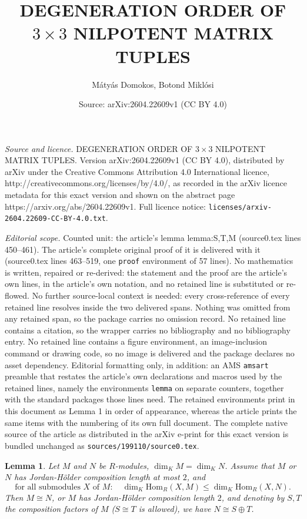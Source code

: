 \documentclass[10pt,a4paper]{amsart}
\title{DEGENERATION ORDER OF $3\times 3$ NILPOTENT MATRIX TUPLES}
\author{M\'aty\'as Domokos, Botond Mikl\'osi}
\date{Source: arXiv:2604.22609v1 (CC BY 4.0)}
\newtheorem{lemma}{Lemma}
\newcommand{\field}{K}
\renewcommand{\hom}{\mathrm{Hom}}
\begin{document}
\maketitle

\noindent\emph{Source and licence.} DEGENERATION ORDER OF $3\times 3$ NILPOTENT MATRIX TUPLES. Version arXiv:2604.22609v1 (CC BY 4.0), distributed by arXiv under the Creative Commons Attribution 4.0 International licence, http://creativecommons.org/licenses/by/4.0/, as recorded in the arXiv licence metadata for this exact version and shown on the abstract page https://arxiv.org/abs/2604.22609v1. Full licence notice: \texttt{licenses/arxiv-2604.22609-CC-BY-4.0.txt}.\par\smallskip

\noindent\textit{Editorial scope.} Counted unit: the article's lemma lemma:S,T,M (source0.tex lines 450--461). The article's complete original proof of it is delivered with it (source0.tex lines 463--519, one \texttt{proof} environment of 57 lines). No mathematics is written, repaired or re-derived: the statement and the proof are the article's own lines, in the article's own notation, and no retained line is substituted or re-flowed.  No further source-local context is needed: every cross-reference of every retained line resolves inside the two delivered spans.  Nothing was omitted from any retained span, so the package carries no omission record.  No retained line contains a citation, so the wrapper carries no bibliography and no bibliography entry.  No retained line contains a figure environment, an image-inclusion command or drawing code, so no image is delivered and the package declares no asset dependency.  Editorial formatting only, in addition: an AMS \texttt{amsart} preamble that restates the article's own declarations and macros used by the retained lines, namely the environments \texttt{lemma} on separate counters, together with the standard packages those lines need.  The retained environments print in this document as Lemma 1 in order of appearance, whereas the article prints the same items with the numbering of its own full document.  The complete native source of the article as distributed in the arXiv e-print for this exact version is bundled unchanged as \texttt{sources/199110/source0.tex}.
\begin{lemma}\label{lemma:S,T,M} 
    Let $M$ and $N$ be $R$-modules, $\dim_\field M=\dim_\field N$.  
    Assume that $M$ 
    or $N$ has 
    Jordan-Hölder composition length at most $2$, and 
    \begin{equation}\label{eq:hom(X,M)}
      \text{for all submodules }X \text{ of }M\colon \quad   \dim_{\field}\hom_{R}(X, M) \leq \dim_{\field}\hom_{R}(X, N).
    \end{equation}    
    Then $M\cong N$, or $M$ has Jordan-Hölder composition length $2$, and 
    denoting by $S,T$ the composition factors of $M$  ($S\cong T$ is allowed), we have 
    $N\cong S\oplus T$. 
\end{lemma}
\end{document}
